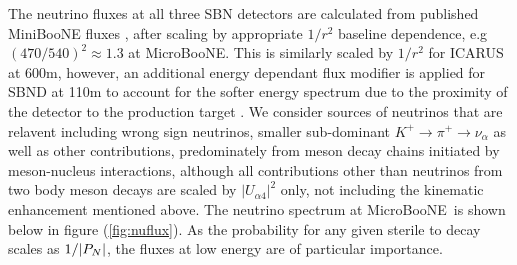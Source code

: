 \documentclass[11pt, a4paper]{article}
\def\muboone{MicroBooNE}
\def\ster{\ensuremath N}
\begin{document}
The neutrino fluxes at all three SBN detectors are calculated from published
MiniBooNE fluxes \cite{AguilarArevalo:2008yp}, after scaling by appropriate
$1/r^2$ baseline dependence, e.g $(470/540)^2 \approx 1.3$ at \muboone. This
is similarly scaled by $1/r^2$ for ICARUS at 600m, however, an additional
energy dependant flux modifier is applied for SBND at 110m to account for the
softer energy spectrum due to the proximity of the detector to the production
target \cite{Antonello:2015lea}. We consider sources of neutrinos that are
relavent including wrong sign neutrinos, smaller sub-dominant $K^+\rightarrow
\pi^+\rightarrow \nu_\alpha$ as well as other contributions, predominately from
meson decay chains initiated by meson-nucleus interactions, although all
contributions other than neutrinos from two body meson decays are scaled by
$|U_{\alpha 4}|^2$ only, not including the kinematic enhancement mentioned
above. The neutrino spectrum at \muboone\ is shown below in figure
(\ref{fig:nuflux}). As the probability for any given sterile to decay scales as
$1/|P_{\ster}|$, the fluxes at low energy are of particular importance. 
\end{document}
